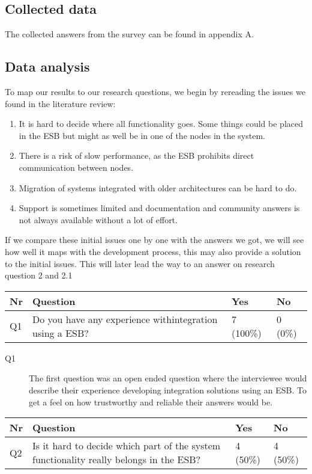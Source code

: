 \documentclass{llncs}
\begin{document}
\subsection{Collected data}
The collected answers from the survey can be found in appendix A.

\subsection{Data analysis}

To map our results to our research questions, we begin by rereading the issues we found in the literature review:

\begin{enumerate}
\item It is hard to decide where all functionality goes. Some things could be placed in the ESB but might as well be in one of the nodes in the system.
\item There is a risk of slow performance, as the ESB prohibits direct communication between nodes.
\item Migration of systems integrated with older architectures can be hard to do.
\item Support is sometimes limited and documentation and community answers is not always available without a lot of effort.
\end{enumerate}

If we compare these initial issues one by one with the answers we got, we will see how well it maps with the development process, this may also provide a solution to the initial issues. This will later lead the way to an answer on research question 2 and 2.1

\begin{tabular}{ | l | p{9cm} | l | l |}
\hline
Nr & Question & Yes & No \\ \hline
Q1 & Do you have any experience withintegration using a ESB? & 7 (100\%) & 0 (0\%) \\ \hline
\end{tabular}

\begin{description}
\item[Q1] The first question was an open ended question where the interviewee would describe their experience developing integration solutions using an ESB. To get a feel on how trustworthy and reliable their answers would be.
\end{description}

\begin{tabular}{ | l | p{9cm} | l | l |}
\hline
Nr & Question & Yes & No \\ \hline
Q2 & Is it hard to decide which part of the system functionality really belongs in the ESB? & 4 (50\%) & 4 (50\%)\\ \hline
\end{tabular}
\end{document}
